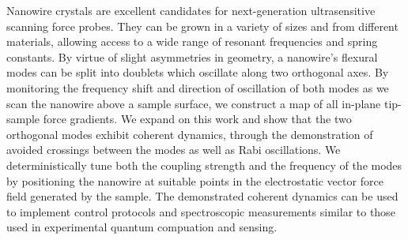 Nanowire crystals are excellent candidates for next-generation ultrasensitive scanning force probes. They can be grown in a variety of sizes and from different materials, allowing access to a wide range of resonant frequencies and spring constants. By virtue of slight asymmetries in geometry, a nanowire's flexural modes can be split into doublets which oscillate along two orthogonal axes. By monitoring the frequency shift and direction of oscillation of both modes as we scan the nanowire above a sample surface, we construct a map of all in-plane tip-sample force gradients\cite{Rossi_2016}. We expand on this work and show that the two orthogonal modes exhibit coherent dynamics, through the demonstration of avoided crossings between the modes as well as Rabi oscillations. We deterministically tune both the coupling strength and the frequency of the modes by positioning the nanowire at suitable points in the electrostatic vector force field generated by the sample. The demonstrated coherent dynamics can be used to implement control protocols and spectroscopic measurements similar to those used in experimental quantum compuation and sensing.